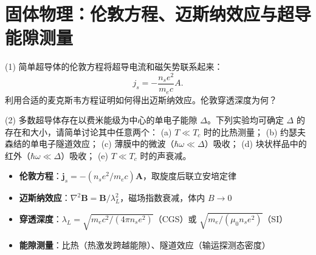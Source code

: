 \section{固体物理：伦敦方程、迈斯纳效应与超导能隙测量}
\label{sec:london-meissner-gap}

\begin{modelbox}[题目：迈斯纳效应与能隙的实验探测]
(1) 简单超导体的伦敦方程将超导电流和磁矢势联系起来：
\begin{equation*}
j_s=-\frac{n_se^2}{m_ec}A.
\end{equation*}
利用合适的麦克斯韦方程证明如何得出迈斯纳效应。伦敦穿透深度为何？

(2) 多数超导体存在以费米能级为中心的单电子能隙 $\Delta$。下列实验均可确定 $\Delta$ 的存在和大小，请简单讨论其中任意两个：
(a) $T\ll T_c$ 时的比热测量；
(b) 约瑟夫森结的单电子隧道效应；
(c) 薄膜中的微波（$\hbar\omega\ll\Delta$）吸收；
(d) 块状样品中的红外（$\hbar\omega\ll\Delta$）吸收；
(e) $T\ll T_c$ 时的声衰减。
\end{modelbox}

\begin{tipbox}[考点快速分析]
\begin{itemize}
    \item \textbf{伦敦方程}：$\bm{j}_s=-(n_se^2/m_ec)\bm{A}$，取旋度后联立安培定律
    \item \textbf{迈斯纳效应}：$\nabla^2\bm{B}=\bm{B}/\lambda_L^2$，磁场指数衰减，体内 $B\to0$
    \item \textbf{穿透深度}：$\lambda_L=\sqrt{m_ec^2/(4\pi n_se^2)}$（CGS）或 $\sqrt{m_e/(\mu_0n_se^2)}$（SI）
    \item \textbf{能隙测量}：比热（热激发跨越能隙）、隧道效应（输运探测态密度）
\end{itemize}
\end{tipbox}

